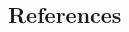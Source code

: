 \documentclass[a0,landscape]{a0poster}
\begin{document}
\begin{multicols}{4}
\color{DarkSlateGray} %



\section*{References}
\nocite{*} %





\end{multicols}
\end{document}
